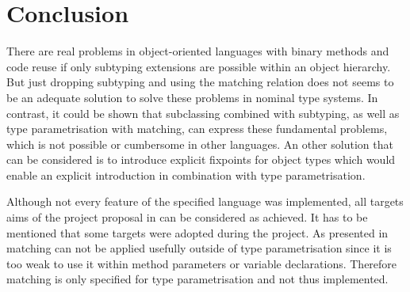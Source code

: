 \section{Conclusion}
\label{ctr:conclusion}
There are real problems in object-oriented languages with binary methods
and code reuse if only subtyping extensions are possible within an object
hierarchy. But just dropping subtyping and using the matching relation
does not seems to be an adequate solution to solve these problems in
nominal type systems. In contrast, it could be shown that subclassing
combined with subtyping, as well as type parametrisation with matching,
can express these fundamental problems, which is not possible or
cumbersome in other languages. An other solution that can be considered
is to introduce explicit fixpoints for object types which would enable
an explicit \mytype introduction in combination with type parametrisation.

Although not every feature of the specified language was implemented,
all targets aims of the project proposal in 
can be considered as achieved. It has to be mentioned that some targets
were adopted during the project. As presented in 
matching can not be applied usefully outside of type parametrisation
since it is too weak to use it within method parameters or variable
declarations.  Therefore matching is only specified for type
parametrisation and not thus implemented.
